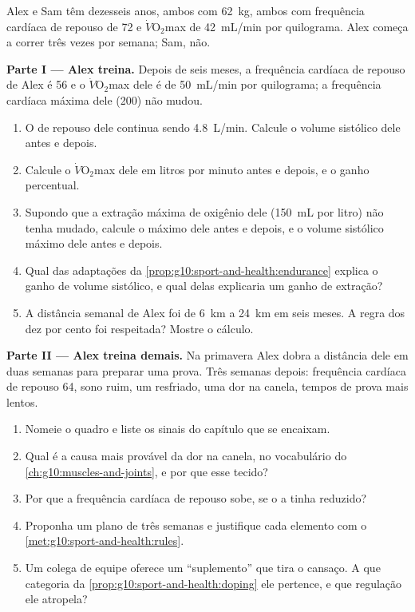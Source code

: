 \begin{problem}
\label{pb:g10:sport-and-health:1}
Alex e Sam têm dezesseis anos, ambos com \qty{62}{kg}, ambos com
frequência cardíaca de repouso de 72 e $\dot V\!\mathrm{O_2}$max de
\qty{42}{mL/min} por quilograma. Alex começa a correr três vezes por
semana; Sam, não.

\medskip
\noindent\textbf{Parte I --- Alex treina.}
Depois de seis meses, a frequência cardíaca de repouso de Alex é 56 e o
$\dot V\!\mathrm{O_2}$max dele é de \qty{50}{mL/min} por quilograma; a
frequência cardíaca máxima dele (200) não mudou.
\begin{enumerate}
  \item O  de repouso dele continua sendo
        \qty{4.8}{L/min}. Calcule o volume sistólico dele antes e
        depois.
  \item Calcule o $\dot V\!\mathrm{O_2}$max dele em litros por minuto
        antes e depois, e o ganho percentual.
  \item Supondo que a extração máxima de oxigênio dele (\qty{150}{mL}
        por litro) não tenha mudado, calcule o  máximo
        dele antes e depois, e o volume sistólico máximo dele antes e
        depois.
  \item Qual das adaptações da
        \cref{prop:g10:sport-and-health:endurance} explica o ganho de
        volume sistólico, e qual delas explicaria um ganho de extração?
  \item A distância semanal de Alex foi de \qty{6}{km} a \qty{24}{km}
        em seis meses. A regra dos dez por cento foi respeitada? Mostre
        o cálculo.
\end{enumerate}

\medskip
\noindent\textbf{Parte II --- Alex treina demais.}
Na primavera Alex dobra a distância dele em duas semanas para preparar
uma prova. Três semanas depois: frequência cardíaca de repouso 64, sono
ruim, um resfriado, uma dor na canela, tempos de prova mais lentos.
\begin{enumerate}[resume]
  \item Nomeie o quadro e liste os sinais do capítulo que se encaixam.
  \item Qual é a causa mais provável da dor na canela, no vocabulário
        do \cref{ch:g10:muscles-and-joints}, e por que esse tecido?
  \item Por que a frequência cardíaca de repouso sobe, se o 
        a tinha reduzido?
  \item Proponha um plano de três semanas e justifique cada elemento
        com o \cref{met:g10:sport-and-health:rules}.
  \item Um colega de equipe oferece um ``suplemento'' que tira o
        cansaço. A que categoria da
        \cref{prop:g10:sport-and-health:doping} ele pertence, e que
        regulação ele atropela?
\end{enumerate}


\end{problem}
